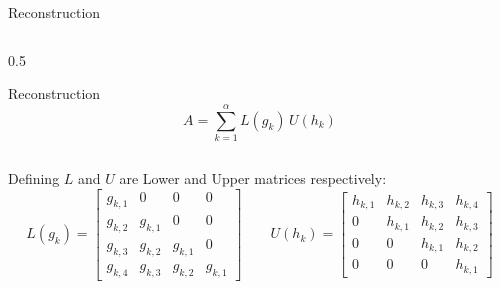 \begin{frame}{Reconstruction}
  \begin{columns}
    \begin{column}{0.5\textwidth}
      \begin{block}{Reconstruction}
        \[
          A = \sum_{k=1}^{\alpha} L(g_k)\, U(h_k)
        \]
      \end{block}
    \end{column}
  \end{columns}

  \vspace{1cm}

  Defining $L$ and $U$ are Lower and Upper matrices respectively:
  $$
  L(g_k) =
  \begin{bmatrix}
    g_{k,1} & 0 & 0 & 0 \\
    g_{k,2} & g_{k,1} & 0 & 0 \\
    g_{k,3} & g_{k,2} & g_{k,1} & 0 \\
    g_{k,4} & g_{k,3} & g_{k,2} & g_{k,1}
  \end{bmatrix}
  \qquad
  U(h_k) =
  \begin{bmatrix}
    h_{k,1} & h_{k,2} & h_{k,3} & h_{k,4} \\
    0 & h_{k,1} & h_{k,2} & h_{k,3} \\
    0 & 0 & h_{k,1} & h_{k,2} \\
    0 & 0 & 0 & h_{k,1}
  \end{bmatrix}
  $$

\end{frame}
